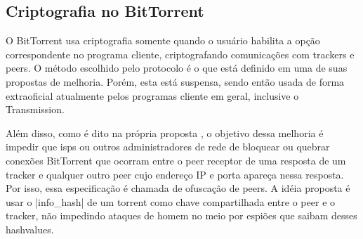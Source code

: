
\subsection*{Criptografia no BitTorrent}

O BitTorrent usa criptografia somente quando o usuário habilita a opção correspondente
no programa cliente, criptografando comunicações com \glspl*{tracker} e \glspl*{peer}.
O método escolhido pelo protocolo é o que está definido em uma de suas propostas de
melhoria. Porém, esta está suspensa, sendo então usada de forma extraoficial atualmente
pelos programas cliente em geral, inclusive o Transmission.

Além disso, como é dito na própria proposta \cite{site:bittorrent-cripto}, o objetivo
dessa melhoria é impedir que \glspl{isp} ou outros administradores de rede de bloquear
ou quebrar conexões BitTorrent que ocorram entre o \gls*{peer} receptor de uma resposta
de um \gls{tracker} e qualquer outro \gls*{peer} cujo endereço IP e porta apareça nessa
resposta. Por isso, essa especificação é chamada de ofuscação de \glspl*{peer}. A idéia
proposta é usar o \bverb|info_hash| de um \gls*{torrent} como chave compartilhada entre
o \gls*{peer} e o \gls*{tracker}, não impedindo ataques de homem no meio por espiões que
saibam desses \glspl{hashvalue}.



